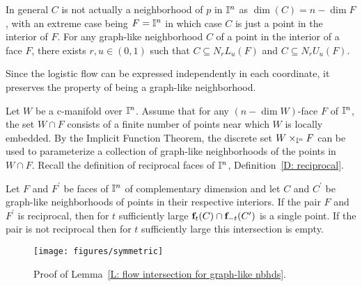 In general $C$ is not actually a neighborhood of $p$ in $\mathbb{I}^n$ as $\dim(C)=n-\dim F$, with an extreme case being $F =\mathbb{I}^n$ in which case $C$ is just a point in the interior of $F$.
For any graph-like neighborhood $C$ of a point in the interior of a face $F$, there exists $r, u \in (0,1)$ such that $C \subseteq N_rL_u(F)$ and $C \subseteq N_rU_u(F)$.

Since the logistic flow can be expressed independently in each coordinate, it preserves the property of being a graph-like neighborhood.

Let $W$ be a c-manifold over $\mathbb{I}^n$.
Assume that for any $(n-\dim W)$-face $F$ of $\mathbb{I}^n$, the set $W \cap F$ consists of a finite number of points near which $W$ is locally embedded.
By the Implicit Function Theorem, the discrete set $W \times_{\mathbb{I}^n} F$ can be used to parameterize a collection of graph-like neighborhoods of the points in $W \cap F$.
Recall the definition of reciprocal faces of $\mathbb{I}^n$, Definition~\ref{D: reciprocal}.

\begin{lemma} \label{L: flow intersection for graph-like nbhds}
	Let $F$ and $F^\prime$ be faces of $\mathbb{I}^n$ of complementary dimension and let $C$ and $C^\prime$ be graph-like neighborhoods of points in their respective interiors.
	If the pair $F$ and $F^\prime$ is reciprocal, then for $t$ sufficiently large $\mathbf{f}_t(C) \cap \mathbf{f}_{-t}(C^\prime)$ is a single point.
	If the pair is not reciprocal then for $t$ sufficiently large this intersection is empty.
\end{lemma}

\begin{figure}[!h]
	\texttt{[image: figures/symmetric]}
	\caption{Proof of Lemma~\ref{L: flow intersection for graph-like nbhds}.}
	\label{F: intersection}
\end{figure}

